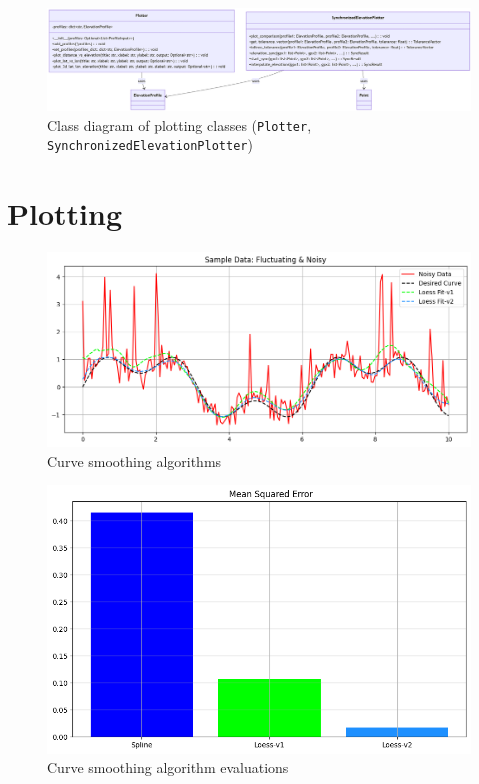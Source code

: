 \documentclass[12pt]{article}
\begin{document}
\begin{figure}[h!]
    \centering
    \includegraphics[width=\textwidth]{Project_Screenshots/class_diagram_plotter.png}
    \caption{Class diagram of plotting classes (\texttt{Plotter}, \texttt{SynchronizedElevationPlotter})}
\end{figure}

\clearpage
\newpage
\section{Plotting}
\begin{figure}[h!]
    \centering
    \includegraphics[width=\textwidth]{Project_Screenshots/curve_smooth.png}
    \caption{Curve smoothing algorithms}
\end{figure}
\begin{figure}[h!]
    \centering
    \includegraphics[width=\textwidth]{Project_Screenshots/curve smooth 2.png}
    \caption{Curve smoothing algorithm evaluations}
\end{figure}
\end{document}
